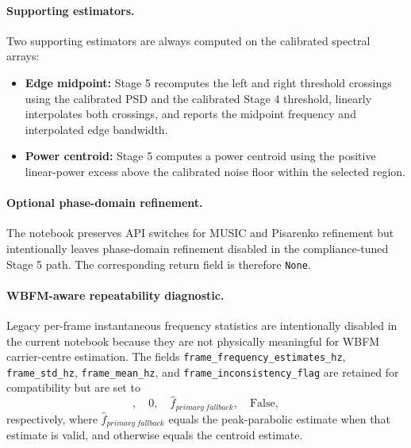 \documentclass[11pt]{article}
\begin{document}
\paragraph{Supporting estimators.}
Two supporting estimators are always computed on the calibrated spectral arrays:
\begin{itemize}
    \item \textbf{Edge midpoint:} Stage 5 recomputes the left and right threshold crossings using the calibrated PSD and the calibrated Stage 4 threshold, linearly interpolates both crossings, and reports the midpoint frequency and interpolated edge bandwidth.
    \item \textbf{Power centroid:} Stage 5 computes a power centroid using the positive linear-power excess above the calibrated noise floor within the selected region.
\end{itemize}

\paragraph{Optional phase-domain refinement.}
The notebook preserves API switches for MUSIC and Pisarenko refinement but intentionally leaves phase-domain refinement disabled in the compliance-tuned Stage 5 path. The corresponding return field is therefore \texttt{None}.

\paragraph{WBFM-aware repeatability diagnostic.}
Legacy per-frame instantaneous frequency statistics are intentionally disabled in the current notebook because they are not physically meaningful for WBFM carrier-centre estimation. The fields \texttt{frame\_frequency\_estimates\_hz}, \texttt{frame\_std\_hz}, \texttt{frame\_mean\_hz}, and \texttt{frame\_inconsistency\_flag} are retained for compatibility but are set to
\begin{equation}
[\,], \quad 0, \quad \hat{f}_{primary\ fallback}, \quad \text{False},
\end{equation}
respectively, where $\hat{f}_{primary\ fallback}$ equals the peak-parabolic estimate when that estimate is valid, and otherwise equals the centroid estimate.
\end{document}
